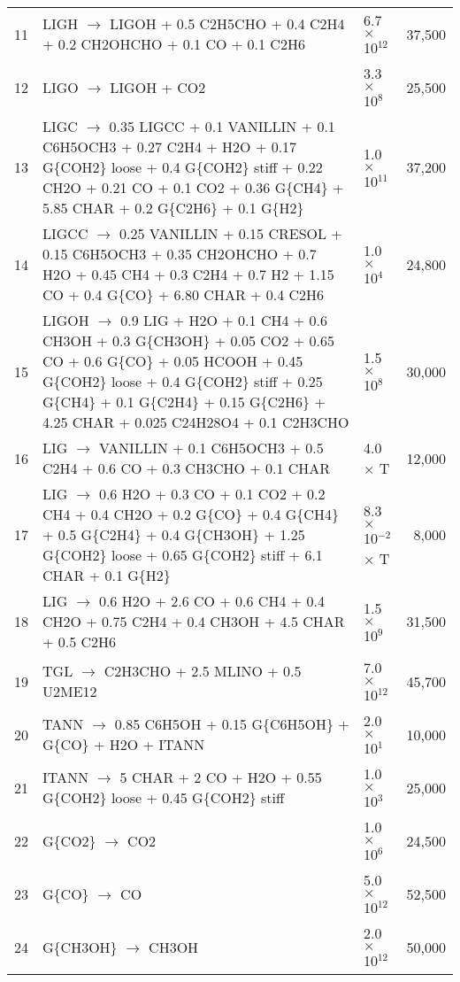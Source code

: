\begin{center}
\begin{longtable}{cp{4in}lr}
        11 & LIGH $\rightarrow$ LIGOH + 0.5 C2H5CHO + 0.4 C2H4 + 0.2 CH2OHCHO + 0.1 CO + 0.1 C2H6 & 6.7 $\times$ 10$^{12}$ & 37,500 \\
        12 & LIGO $\rightarrow$ LIGOH + CO2 & 3.3 $\times$ 10$^8$ & 25,500 \\
        13 & LIGC $\rightarrow$ 0.35 LIGCC + 0.1 VANILLIN + 0.1 C6H5OCH3 + 0.27 C2H4 + H2O + 0.17 G\{COH2\} loose + 0.4 G\{COH2\} stiff + 0.22 CH2O + 0.21 CO + 0.1 CO2 + 0.36 G\{CH4\} + 5.85 CHAR + 0.2 G\{C2H6\} + 0.1 G\{H2\} & 1.0 $\times$ 10$^{11}$ & 37,200 \\
        14 & LIGCC $\rightarrow$ 0.25 VANILLIN + 0.15 CRESOL + 0.15 C6H5OCH3 + 0.35 CH2OHCHO + 0.7 H2O + 0.45 CH4 + 0.3 C2H4 + 0.7 H2 + 1.15 CO + 0.4 G\{CO\} + 6.80 CHAR + 0.4 C2H6 & 1.0 $\times$ 10$^4$ & 24,800 \\
        15 & LIGOH $\rightarrow$ 0.9 LIG + H2O + 0.1 CH4 + 0.6 CH3OH + 0.3 G\{CH3OH\} + 0.05 CO2 + 0.65 CO + 0.6 G\{CO\} + 0.05 HCOOH + 0.45 G\{COH2\} loose + 0.4 G\{COH2\} stiff + 0.25 G\{CH4\} + 0.1 G\{C2H4\} + 0.15 G\{C2H6\} + 4.25 CHAR + 0.025 C24H28O4 + 0.1 C2H3CHO & 1.5 $\times$ 10$^8$ & 30,000 \\
        16 & LIG $\rightarrow$ VANILLIN + 0.1 C6H5OCH3 + 0.5 C2H4 + 0.6 CO + 0.3 CH3CHO + 0.1 CHAR & 4.0 $\times$ T & 12,000 \\
        17 & LIG $\rightarrow$ 0.6 H2O + 0.3 CO + 0.1 CO2 + 0.2 CH4 + 0.4 CH2O + 0.2 G\{CO\} + 0.4 G\{CH4\} + 0.5 G\{C2H4\} + 0.4 G\{CH3OH\} + 1.25 G\{COH2\} loose + 0.65 G\{COH2\} stiff + 6.1 CHAR + 0.1 G\{H2\} & 8.3 $\times$ 10$^{-2}$ $\times$ T & 8,000 \\
        18 & LIG $\rightarrow$ 0.6 H2O + 2.6 CO + 0.6 CH4 + 0.4 CH2O + 0.75 C2H4 + 0.4 CH3OH + 4.5 CHAR + 0.5 C2H6 & 1.5 $\times$ 10$^9$ & 31,500 \\
        19 & TGL $\rightarrow$ C2H3CHO + 2.5 MLINO + 0.5 U2ME12 & 7.0 $\times$ 10$^{12}$ & 45,700 \\
        20 & TANN $\rightarrow$ 0.85 C6H5OH + 0.15 G\{C6H5OH\} + G\{CO\} + H2O + ITANN & 2.0 $\times$ 10$^1$ & 10,000 \\
        21 & ITANN $\rightarrow$ 5 CHAR + 2 CO + H2O + 0.55 G\{COH2\} loose + 0.45 G\{COH2\} stiff & 1.0 $\times$ 10$^3$ & 25,000 \\
        22 & G\{CO2\} $\rightarrow$ CO2 & 1.0 $\times$ 10$^6$ & 24,500 \\
        23 & G\{CO\} $\rightarrow$ CO & 5.0 $\times$ 10$^{12}$ & 52,500 \\
        24 & G\{CH3OH\} $\rightarrow$ CH3OH & 2.0 $\times$ 10$^{12}$ & 50,000 \\

\end{longtable}
\end{center}
